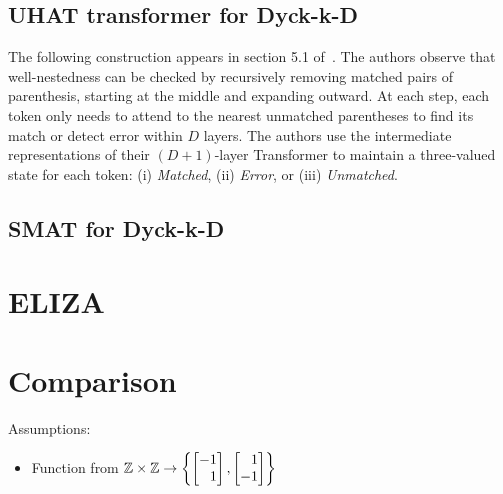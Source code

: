\subsection{UHAT transformer for Dyck-k-D}
The following construction appears in section 5.1 of~\citet{yao2021self}. 
The authors observe that well-nestedness can be checked by recursively removing matched pairs of parenthesis, starting at the middle and expanding outward. At each step, each token only needs to attend to the nearest unmatched parentheses to find its match or detect error within $D$ layers.
The authors use the intermediate representations of their $(D{+}1)$-layer Transformer to maintain a three-valued state for each token: (i) \textit{Matched}, (ii) \textit{Error}, or (iii) \textit{Unmatched}. 

\subsection{SMAT for Dyck-k-D}


\section{ELIZA}


\section{Comparison}
\label{sec:assembly_comparison}


Assumptions:
\begin{itemize}
    \item Function from $\Z\times\Z\to \left\{\begin{bmatrix}
            -1\\\phantom- 1
        \end{bmatrix}, \begin{bmatrix}
            \phantom- 1\\-1
        \end{bmatrix}\right\}$
\end{itemize}

